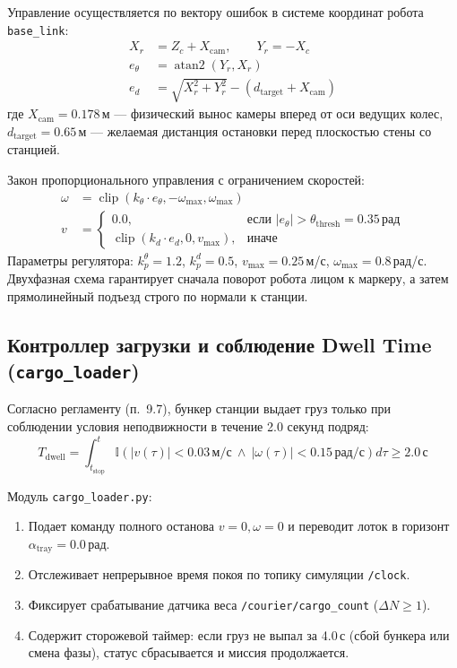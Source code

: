 \documentclass[a4paper,11pt]{article}
\begin{document}
Управление осуществляется по вектору ошибок в системе координат робота \texttt{base\_link}:
\begin{align}
X_r &= Z_c + X_{\text{cam}}, \qquad Y_r = -X_c \\
e_\theta &= \operatorname{atan2}(Y_r, X_r) \\
e_d &= \sqrt{X_r^2 + Y_r^2} - (d_{\text{target}} + X_{\text{cam}})
\end{align}
где $X_{\text{cam}} = 0.178$\,м — физический вынос камеры вперед от оси ведущих колес, $d_{\text{target}} = 0.65$\,м — желаемая дистанция остановки перед плоскостью стены со станцией.

Закон пропорционального управления с ограничением скоростей:
\begin{align}
\omega &= \operatorname{clip}(k_\theta \cdot e_\theta, -\omega_{\text{max}}, \omega_{\text{max}}) \\
v &= \begin{cases} 
0.0, & \text{если } |e_\theta| > \theta_{\text{thresh}} = 0.35\,\text{рад} \\
\operatorname{clip}(k_d \cdot e_d, 0, v_{\text{max}}), & \text{иначе}
\end{cases}
\end{align}
Параметры регулятора: $k_p^\theta = 1.2$, $k_p^d = 0.5$, $v_{\text{max}} = 0.25$\,м/с, $\omega_{\text{max}} = 0.8$\,рад/с. Двухфазная схема гарантирует сначала поворот робота лицом к маркеру, а затем прямолинейный подъезд строго по нормали к станции.

\subsection{Контроллер загрузки и соблюдение Dwell Time (\texttt{cargo\_loader})}
Согласно регламенту (п.~9.7), бункер станции выдает груз только при соблюдении условия неподвижности в течение 2.0 секунд подряд:
\begin{equation}
T_{\text{dwell}} = \int_{t_{\text{stop}}}^{t} \mathbb{I}\left( |v(\tau)| < 0.03\,\text{м/с} \ \land \ |\omega(\tau)| < 0.15\,\text{рад/с} \right) d\tau \ge 2.0\,\text{с}
\end{equation}

Модуль \texttt{cargo\_loader.py}:
\begin{enumerate}
    \item Подает команду полного останова $v=0, \omega=0$ и переводит лоток в горизонт $\alpha_{\text{tray}} = 0.0$\,рад.
    \item Отслеживает непрерывное время покоя по топику симуляции \texttt{/clock}.
    \item Фиксирует срабатывание датчика веса \texttt{/courier/cargo\_count} ($\Delta N \ge 1$).
    \item Содержит сторожевой таймер: если груз не выпал за 4.0\,с (сбой бункера или смена фазы), статус сбрасывается и миссия продолжается.
\end{enumerate}
\end{document}
